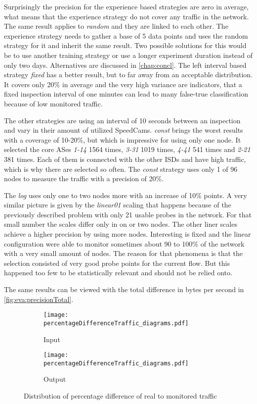 \documentclass[thesis.tex]{subfiles}
\begin{document}
Surprisingly the precision for the experience based strategies are zero in average, what means that the experience strategy do not cover any traffic in the network. The same result applies to \textit{random} and they are linked to each other. The experience strategy needs to gather a base of 5 data points and uses the random strategy for it and inherit the same result. Two possible solutions for this would be to use another training strategy or use a longer experiment duration instead of only two days. Alternatives are discussed in \autoref{chap:concl}. The left interval based strategy \textit{fixed} has a better result, but to far away from an acceptable distribution. It covers only 20\% in average and the very high variance are indicators, that a fixed inspection interval of one minutes can lead to many false-true classification because of low monitored traffic.

The other strategies are using an interval of 10 seconds between an inspection and vary in their amount of utilized SpeedCams. \textit{const} brings the worst results with a coverage of 10-20\%, but which is impressive for using only one node. It selected the core ASes \textit{1-14} 1564 times, \textit{3-31} 1019 times, \textit{4-41} 541 times and \textit{2-21} 381 times. Each of them is connected with the other ISDs and have high traffic, which is why there are selected so often. The \textit{const} strategy uses only 1 of 96 nodes to measure the traffic with a precision of 20\%.

The \textit{log} uses only one to two nodes more with an increase of 10\% points. A very similar picture is given by the \textit{linear01} scaling that happens because of the previously described problem with only 21 usable probes in the network. For that small number the scales differ only in on or two nodes. The other liner scales achieve a higher precision by using more nodes. Interesting is fixed and the linear configuration were able to monitor sometimes about 90 to 100\% of the network with a very small amount of nodes. The reason for that phenomena is that the selection consisted of very good probe points for the current flow. But this happened too few to be statistically relevant and should not be relied onto.

The same results can be viewed with the total difference in bytes per second in \autoref{fig:eva:precisionTotal}.

\begin{figure}[h]
	\centering
	\begin{subfigure}{.8\linewidth}
		\centering
		\texttt{[image: percentageDifferenceTraffic\_diagrams.pdf]}
		\caption{Input}
		\label{fig:eva:precisionPercent:input}
	\end{subfigure}
	\hfil
	\begin{subfigure}{0.8\linewidth}
		\centering
		\texttt{[image: percentageDifferenceTraffic\_diagrams.pdf]}
		\caption{Output}
		\label{fig:eva:precisionPercent:output}
	\end{subfigure}
	\caption{Distribution of percentage difference of real to monitored traffic}
	\label{fig:eva:precisionPercent}
\end{figure}
\end{document}
